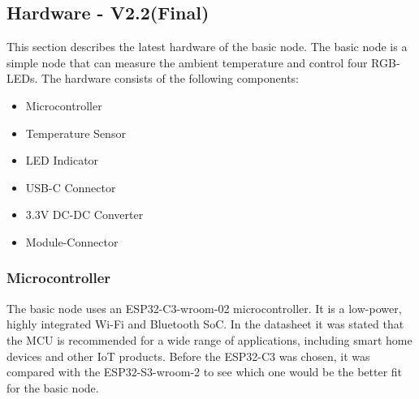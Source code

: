 \subsection{Hardware - V2.2(Final)}


    This section describes the latest hardware of the basic node. The basic node is a 
    simple node that can measure the ambient temperature and control four RGB-LEDs.
    The hardware consists of the following components:

    \begin{itemize}
        \item Microcontroller
        \item Temperature Sensor
        \item LED Indicator
        \item USB-C Connector
        \item 3.3V DC-DC Converter
        \item Module-Connector
    \end{itemize}

    \subsubsection{Microcontroller}
        The basic node uses an ESP32-C3-wroom-02 \cite{noauthor_esp32-c3_2023} microcontroller. 
        It is a low-power, highly integrated Wi-Fi and Bluetooth SoC. In the datasheet 
        it was stated that the MCU is recommended for a wide range of applications, including smart home devices 
        and other IoT products.
        Before the ESP32-C3 was chosen, it was compared with the ESP32-S3-wroom-2 to see which one
        would be the better fit for the basic node. 

        \vspace{0.5cm}
        \begin{Parallel}{0.45\textwidth}{0.45\textwidth}
            \ParallelPar
        \end{Parallel}

